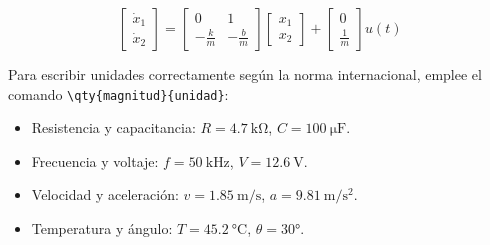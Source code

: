 \begin{equation}
    \begin{bmatrix}
        \dot{x}_1 \\
        \dot{x}_2
    \end{bmatrix}
    =
    \begin{bmatrix}
        0 & 1 \\
        -\frac{k}{m} & -\frac{b}{m}
    \end{bmatrix}
    \begin{bmatrix}
        x_1 \\
        x_2
    \end{bmatrix}
    +
    \begin{bmatrix}
        0 \\
        \frac{1}{m}
    \end{bmatrix}
    u(t)
    \label{eq:matriz-estados}
\end{equation}

Para escribir unidades correctamente según la norma internacional, emplee el comando \texttt{\textbackslash qty\{magnitud\}\{unidad\}}:
\begin{itemize}
    \item Resistencia y capacitancia: $R = \qty{4.7}{\kilo\ohm}$, $C = \qty{100}{\micro\farad}$.
    \item Frecuencia y voltaje: $f = \qty{50}{\kilo\hertz}$, $V = \qty{12.6}{\volt}$.
    \item Velocidad y aceleración: $v = \qty{1.85}{\meter\per\second}$, $a = \qty{9.81}{\meter\per\second\squared}$.
    \item Temperatura y ángulo: $T = \qty{45.2}{\degreeCelsius}$, $\theta = \ang{30}$.
\end{itemize}
